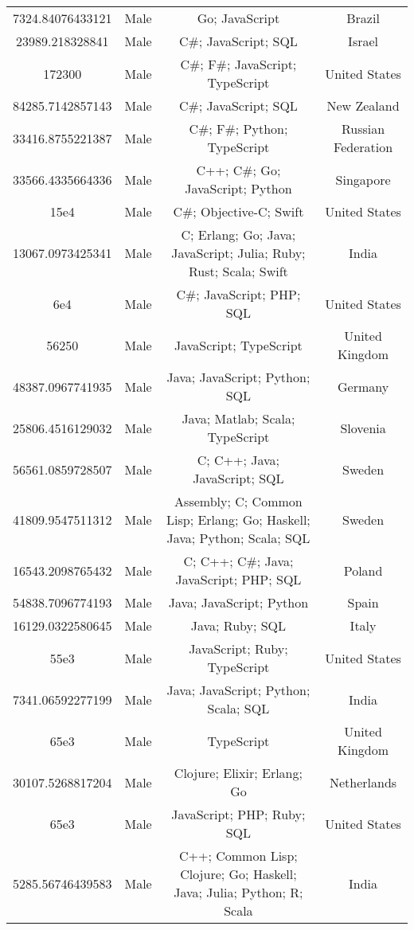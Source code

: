 \begin{center}
\begin{tabular}{ |c|c|c|c| }
7324.84076433121  &  Male  &  Go; JavaScript  &  Brazil  \\ 
23989.218328841  &  Male  &  C\#; JavaScript; SQL  &  Israel  \\ 
172300  &  Male  &  C\#; F\#; JavaScript; TypeScript  &  United States  \\ 
84285.7142857143  &  Male  &  C\#; JavaScript; SQL  &  New Zealand  \\ 
33416.8755221387  &  Male  &  C\#; F\#; Python; TypeScript  &  Russian Federation  \\ 
33566.4335664336  &  Male  &  C++; C\#; Go; JavaScript; Python  &  Singapore  \\ 
15e4  &  Male  &  C\#; Objective-C; Swift  &  United States  \\ 
13067.0973425341  &  Male  &  C; Erlang; Go; Java; JavaScript; Julia; Ruby; Rust; Scala; Swift  &  India  \\ 
6e4  &  Male  &  C\#; JavaScript; PHP; SQL  &  United States  \\ 
56250  &  Male  &  JavaScript; TypeScript  &  United Kingdom  \\ 
48387.0967741935  &  Male  &  Java; JavaScript; Python; SQL  &  Germany  \\ 
25806.4516129032  &  Male  &  Java; Matlab; Scala; TypeScript  &  Slovenia  \\ 
56561.0859728507  &  Male  &  C; C++; Java; JavaScript; SQL  &  Sweden  \\ 
41809.9547511312  &  Male  &  Assembly; C; Common Lisp; Erlang; Go; Haskell; Java; Python; Scala; SQL  &  Sweden  \\ 
16543.2098765432  &  Male  &  C; C++; C\#; Java; JavaScript; PHP; SQL  &  Poland  \\ 
54838.7096774193  &  Male  &  Java; JavaScript; Python  &  Spain  \\ 
16129.0322580645  &  Male  &  Java; Ruby; SQL  &  Italy  \\ 
55e3  &  Male  &  JavaScript; Ruby; TypeScript  &  United States  \\ 
7341.06592277199  &  Male  &  Java; JavaScript; Python; Scala; SQL  &  India  \\ 
65e3  &  Male  &  TypeScript  &  United Kingdom  \\ 
30107.5268817204  &  Male  &  Clojure; Elixir; Erlang; Go  &  Netherlands  \\ 
65e3  &  Male  &  JavaScript; PHP; Ruby; SQL  &  United States  \\ 
5285.56746439583  &  Male  &  C++; Common Lisp; Clojure; Go; Haskell; Java; Julia; Python; R; Scala  &  India  \\ 

\end{tabular}
\end{center}
